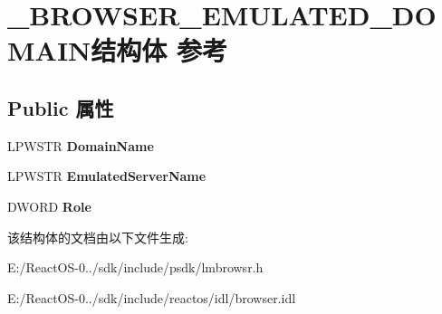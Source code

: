 \hypertarget{struct___b_r_o_w_s_e_r___e_m_u_l_a_t_e_d___d_o_m_a_i_n}{}\section{\+\_\+\+B\+R\+O\+W\+S\+E\+R\+\_\+\+E\+M\+U\+L\+A\+T\+E\+D\+\_\+\+D\+O\+M\+A\+I\+N结构体 参考}
\label{struct___b_r_o_w_s_e_r___e_m_u_l_a_t_e_d___d_o_m_a_i_n}
\subsection*{Public 属性}
\begin{DoxyCompactItemize}
\item 
\mbox{\label{struct___b_r_o_w_s_e_r___e_m_u_l_a_t_e_d___d_o_m_a_i_n_ae3c85fce8af85e5cd71e29fd98137b2f}} 
L\+P\+W\+S\+TR {\bfseries Domain\+Name}
\item 
\mbox{\label{struct___b_r_o_w_s_e_r___e_m_u_l_a_t_e_d___d_o_m_a_i_n_a51fe7329f21f112a23caf0241825cb0b}} 
L\+P\+W\+S\+TR {\bfseries Emulated\+Server\+Name}
\item 
\mbox{\label{struct___b_r_o_w_s_e_r___e_m_u_l_a_t_e_d___d_o_m_a_i_n_a70482b7e72d9e63060e5424c488b273d}} 
D\+W\+O\+RD {\bfseries Role}
\end{DoxyCompactItemize}


该结构体的文档由以下文件生成\+:\begin{DoxyCompactItemize}
\item 
E\+:/\+React\+O\+S-\/0../sdk/include/psdk/lmbrowsr.\+h\item 
E\+:/\+React\+O\+S-\/0../sdk/include/reactos/idl/browser.\+idl\end{DoxyCompactItemize}
